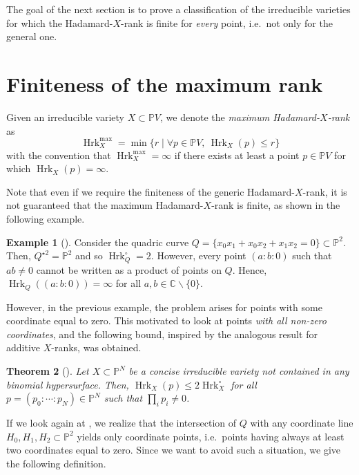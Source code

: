 \documentclass{amsart}
\theoremstyle{plain}
\newtheorem{theorem}{Theorem}
\numberwithin{theorem}{section}
\theoremstyle{definition}
\newtheorem{example}[theorem]{Example}
\newcommand{\bbC}{\mathbb{C}}
\newcommand{\bbP}{\mathbb{P}}
\newcommand{\Hrk}{\operatorname{Hrk}}
\begin{document}
The goal of the next section is to prove a classification of the irreducible varieties for which the Hadamard-$X$-rank is finite for \textit{every} point, i.e.\ not only for the general one.

\section{Finiteness of the maximum rank}

Given an irreducible variety $X \subset \bbP V$, we denote the \emph{maximum Hadamard-$X$-rank} as
\[
    \Hrk^{\max}_X = \min\{r \mid \forall p\in \bbP V,\ \Hrk_X(p) \leq r\}
\]
with the convention that $\Hrk^{\max}_X = \infty$ if there exists at least a point $p \in \bbP V$ for which $\Hrk_X(p) = \infty$.

Note that even if we require the finiteness of the generic Hadamard-$X$-rank, it is not guaranteed that the maximum Hadamard-$X$-rank is finite, as shown in the following example. 
%
\begin{example}[\cite{hadamardranks}]\label{example:maximum_nonfinite}
    Consider the quadric curve $Q = \{ x_0x_1 + x_0x_2 + x_1x_2 = 0 \} \subset \bbP^2$. Then, $Q^{\star 2} = \bbP^2$ and so $\Hrk_Q^\circ = 2$. However, every point $(a:b:0)$ such that $ab \neq 0$ cannot be written as a product of points on $Q$. Hence, $\Hrk_Q((a:b:0)) = \infty$ for all $a,b \in \bbC \smallsetminus \{0\}$.
\end{example}
%
However, in the previous example, the problem arises for points with some coordinate equal to zero. This motivated to look at points {\em with all non-zero coordinates}, and the following bound, inspired by the analogous result \cite[Theorem 1]{blekherman2015maximum} for additive $X$-ranks, was obtained.

\begin{theorem}[\cite{hadamardranks}]\label{thm:finitess_torus}
    Let $X \subset \bbP^N$ be a concise irreducible variety not contained in any binomial hypersurface. Then, $\Hrk_X(p) \leq 2 \Hrk_X^\circ$ for all $p =(p_0:\cdots:p_N) \in \bbP^N$ such that $\prod_i p_i \neq 0$.
\end{theorem}

If we look again at , we realize that the intersection of $Q$ with any coordinate line $H_0, H_1, H_2 \subset \bbP^2$ yields only coordinate points, i.e.\ points having always at least two coordinates equal to zero. Since we want to avoid such a situation, we give the following definition.
\end{document}
